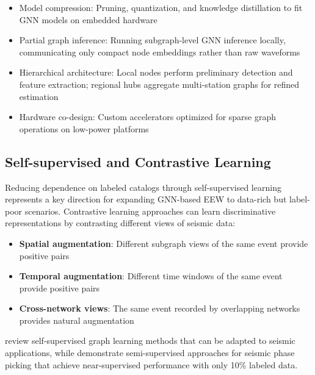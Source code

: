 \documentclass[review,authoryear]{elsarticle}
\begin{document}
\begin{itemize}
  \item Model compression: Pruning, quantization, and knowledge distillation to fit GNN models on embedded hardware \citep{shi2016edge, chen2019deep}
  \item Partial graph inference: Running subgraph-level GNN inference locally, communicating only compact node embeddings rather than raw waveforms
  \item Hierarchical architecture: Local nodes perform preliminary detection and feature extraction; regional hubs aggregate multi-station graphs for refined estimation
  \item Hardware co-design: Custom accelerators optimized for sparse graph operations on low-power platforms
\end{itemize}

\subsection{Self-supervised and Contrastive Learning}

Reducing dependence on labeled catalogs through self-supervised learning represents a key direction for expanding GNN-based EEW to data-rich but label-poor scenarios. Contrastive learning approaches \citep{chen2020simple} can learn discriminative representations by contrasting different views of seismic data:

\begin{itemize}
  \item \textbf{Spatial augmentation}: Different subgraph views of the same event provide positive pairs
  \item \textbf{Temporal augmentation}: Different time windows of the same event provide positive pairs
  \item \textbf{Cross-network views}: The same event recorded by overlapping networks provides natural augmentation
\end{itemize}

\citet{liu2022graph} review self-supervised graph learning methods that can be adapted to seismic applications, while \citet{zhu2023seismic} demonstrate semi-supervised approaches for seismic phase picking that achieve near-supervised performance with only 10\% labeled data.
\end{document}
